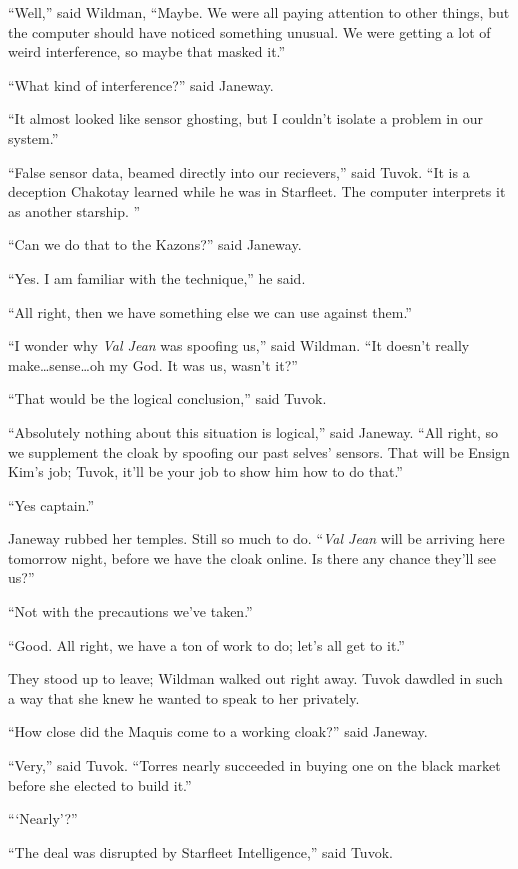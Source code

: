 \documentclass[twoside,letterpaper,12pt]{memoir}
\begin{document}
``Well,'' said Wildman, ``Maybe. We were all paying attention to other things, but the computer should have noticed something unusual. We were getting a lot of weird interference, so maybe that masked it.'' 

``What kind of interference?'' said Janeway. 

``It almost looked like sensor ghosting, but I couldn't isolate a problem in our system.'' 

``False sensor data, beamed directly into our recievers,'' said Tuvok. ``It is a deception Chakotay learned while he was in Starfleet. The computer interprets it as another starship. '' 

``Can we do that to the Kazons?'' said Janeway. 

``Yes. I am familiar with the technique,'' he said. 

``All right, then we have something else we can use against them.'' 

``I wonder why \textit{Val Jean} was spoofing us,'' said Wildman. ``It doesn't really make\ldots sense\ldots oh my God. It was us, wasn't it?'' 

``That would be the logical conclusion,'' said Tuvok. 

``Absolutely nothing about this situation is logical,'' said Janeway. ``All right, so we supplement the cloak by spoofing our past selves' sensors. That will be Ensign Kim's job; Tuvok, it'll be your job to show him how to do that.'' 

``Yes captain.'' 

Janeway rubbed her temples. Still so much to do. ``\textit{Val Jean} will be arriving here tomorrow night, before we have the cloak online. Is there any chance they'll see us?'' 

``Not with the precautions we’ve taken.'' 

``Good. All right, we have a ton of work to do; let's all get to it.'' 

They stood up to leave; Wildman walked out right away. Tuvok dawdled in such a way that she knew he wanted to speak to her privately. 

``How close did the Maquis come to a working cloak?'' said Janeway. 

``Very,'' said Tuvok. ``Torres nearly succeeded in buying one on the black market before she elected to build it.'' 

```Nearly'?'' 

``The deal was disrupted by Starfleet Intelligence,'' said Tuvok. 
\end{document}
